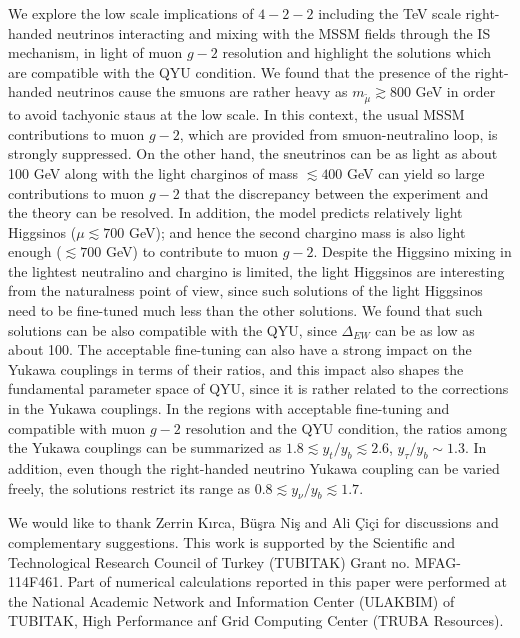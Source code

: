 \documentclass[12pt]{article}
\begin{document}
We explore the low scale implications of $4-2-2$ including the TeV scale right-handed neutrinos interacting and mixing with the MSSM fields through the IS mechanism, in light of muon $g-2$ resolution and highlight the solutions which are compatible with the QYU condition. We found that the presence of the right-handed neutrinos cause the smuons are rather heavy as $m_{\tilde{\mu}} \gtrsim 800$ GeV in order to avoid tachyonic staus at the low scale. In this context, the usual MSSM contributions to muon $g-2$, which are provided from smuon-neutralino loop, is strongly suppressed. On the other hand, the sneutrinos can be as light as about 100 GeV along with the light charginos of mass $\lesssim 400$ GeV can yield so large contributions to muon $g-2$ that the discrepancy between the experiment and the theory can be resolved. In addition, the model predicts relatively light Higgsinos ($\mu \lesssim 700$ GeV); and hence the second chargino mass is also light enough ($\lesssim 700$ GeV) to contribute to muon $g-2$. Despite the Higgsino mixing in the lightest neutralino and chargino is limited, the light Higgsinos are interesting from the naturalness point of view, since such solutions of the light Higgsinos need to be fine-tuned much less than the other solutions. We found that such solutions can be also compatible with the QYU, since $\Delta_{EW}$ can be as low as about 100. The acceptable fine-tuning can also have a strong impact on the Yukawa couplings in terms of their ratios, and this impact also shapes the fundamental parameter space of QYU, since it is rather related to the corrections in the Yukawa couplings. In the regions with acceptable fine-tuning and compatible with muon $g-2$ resolution and the QYU condition, the ratios among the Yukawa couplings can be summarized as $1.8 \lesssim y_{t}/y_{b} \lesssim 2.6$, $y_{\tau}/y_{b}\sim 1.3 $. In addition, even though the right-handed neutrino Yukawa coupling can be varied freely, the solutions restrict its range as $0.8\lesssim y_{\nu}/y_{b} \lesssim 1.7$. 


\vspace{0.3cm}

We would like to thank Zerrin K\i rca, B\"{u}\c{s}ra Ni\c{s} and Ali \c{C}i\c{c}i for discussions and complementary suggestions. This work is supported by the Scientific and Technological Research Council of Turkey (TUBITAK) Grant no. MFAG-114F461. Part of numerical calculations reported in this paper were performed at the National Academic Network and Information Center (ULAKBIM) of TUBITAK, High Performance anf Grid Computing Center (TRUBA Resources).
\end{document}
